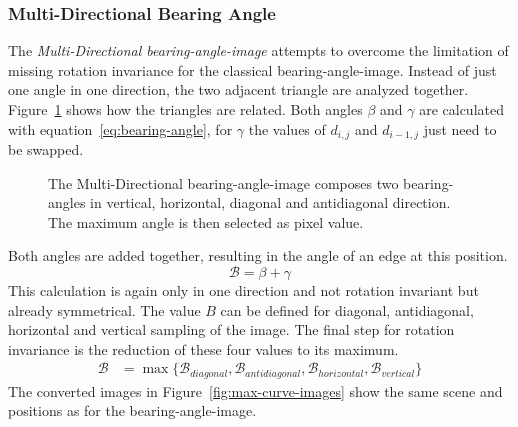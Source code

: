 \subsubsection{Multi-Directional Bearing Angle}

The \emph{Multi-Directional \gls{bearing-angle-image}} attempts to overcome the limitation of missing rotation invariance for the classical \gls{bearing-angle-image}.
Instead of just one angle in one direction, the two adjacent triangle are analyzed together.
Figure~\ref{fig:max-curve} shows how the triangles are related.
Both angles $\beta$ and $\gamma$ are calculated with equation~\ref{eq:bearing-angle}, for $\gamma$ the values of $d_{i,j}$ and $d_{i-1,j}$ just need to be swapped.
\begin{figure}
    \scalebox{0.9}{%
    
    }
    \caption[Schematic Representation of the Multi-Directional \gls{bearing-angle-image}]{The Multi-Directional \gls{bearing-angle-image} composes two \Glspl{bearing-angle} in vertical, horizontal, diagonal and antidiagonal direction. The maximum angle is then selected as pixel value.}\label{fig:max-curve}
\end{figure}
Both angles are added together, resulting in the angle of an edge at this position.
\begin{equation}
    \mathcal{B} = \beta + \gamma
\end{equation}
This calculation is again only in one direction and not rotation invariant but already symmetrical.
The value $B$ can be defined for diagonal, antidiagonal, horizontal and vertical sampling of the image.
The final step for rotation invariance is the reduction of these four values to its maximum.
\begin{align}
    \mathcal{B} &= \max{\{\mathcal{B}_{diagonal}, \mathcal{B}_{antidiagonal}, \mathcal{B}_{horizontal}, \mathcal{B}_{vertical}\}}
\end{align}
The converted images in Figure~\ref{fig:max-curve-images} show the same scene and positions as for the \gls{bearing-angle-image}.
